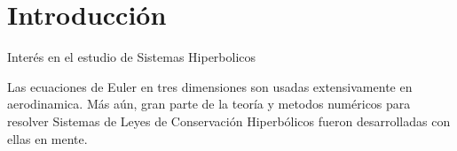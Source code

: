 \chapter{Introducción}\label{cap:introduccion}

Interés en el estudio de Sistemas Hiperbolicos

Las ecuaciones de Euler en tres dimensiones son usadas extensivamente en aerodinamica. Más aún, gran parte de la teoría y metodos numéricos para resolver Sistemas de Leyes de Conservación Hiperbólicos fueron desarrolladas con ellas en mente.